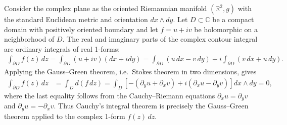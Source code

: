 \documentclass[../geometry_main.tex]{subfiles}
\begin{document}
\begin{mytheorem}
Consider the complex plane as the oriented Riemannian manifold $(\mathbb{R}^2,g)$ with the standard Euclidean metric and orientation $dx\wedge dy$.
Let $D\subset\mathbb{C}$ be a compact domain with positively oriented boundary and let $f=u+iv$ be holomorphic on a neighborhood of $D$.
The real and imaginary parts of the complex contour integral are ordinary integrals of real 1-forms:
\begin{align}
    \int_{\partial D} f(z)\,dz = \int_{\partial D} (u+iv)(dx+idy)
    = \int_{\partial D} (u\,dx-v\,dy)
    + i\int_{\partial D} (v\,dx+u\,dy).
\end{align}
Applying the Gauss--Green theorem, i.e.\ Stokes theorem in two dimensions, gives
\begin{align}
    \int_{\partial D} f(z)\,dz
    &= \int_D d(f\,dz) 
    = \int_D
    \left[-(\partial_y u+\partial_x v)
    +i(\partial_x u-\partial_y v)\right]dx\wedge dy
    =0,
\end{align}
where the last equality follows from the Cauchy--Riemann equations
$\partial_xu=\partial_yv$ and $\partial_yu=-\partial_xv$.
Thus Cauchy's integral theorem is precisely the Gauss--Green theorem applied to the complex 1-form $f(z)\,dz$.
\end{mytheorem}
\end{document}
